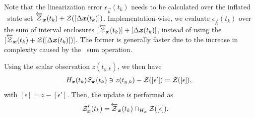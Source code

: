 \documentclass{ifacconf}
\begin{document}
Note that the linearization error $\epsilon_{\vec{h}}(t_k)$ needs to be calculated over the inflated \apriori\ state set ${\overleftarrow{\mathcal{Z}}_{\boldsymbol{x}} (t_k) + \mathcal{Z}([\Delta \boldsymbol{x}(t_k)])}$.
Implementation-wise, we evaluate $\epsilon_{\vec{h}}(t_k)$ over the sum of interval enclosures ${[\overleftarrow{\mathcal{Z}}_{\boldsymbol{x}} (t_k)] + [\Delta \boldsymbol{x}(t_k)]}$, instead of using the ${[\overleftarrow{\mathcal{Z}}_{\boldsymbol{x}} (t_k) + \mathcal{Z}([\Delta \boldsymbol{x}(t_k)])]}$. The former is generally faster due to the increase in complexity caused by the \cz\ sum operation.

Using the scalar observation $z(t_{y,k})$, we then have
\begin{align}
{H_{\boldsymbol{x}}(t_k)
  \mathcal{Z}_{\boldsymbol{x}} (t_k)
  \ni  z(t_{y,k})
              - \mathcal{Z}([\epsilon']) =
                \mathcal{Z}([\epsilon])},
\end{align}
with ${[\epsilon] = z - [\epsilon']}$.
Then, the update is performed as 
\begin{align}
  \set{Z}'_{\vec{x}}(t_{k})
  =\, &
      \pre{\set{Z}}_{\vec{x}} (t_k)
      \cap_{H_{\vec{x}}}
      \set{Z}([\epsilon]). \label{eq:czesmf_update_start}%
\end{align}
\end{document}
